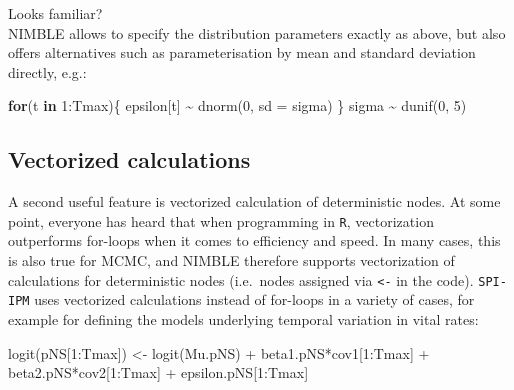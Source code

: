 \documentclass[
]{book}
\newenvironment{Shaded}{\begin{snugshade}}{\end{snugshade}}
\newcommand{\AttributeTok}[1]{\textcolor[rgb]{0.77,0.63,0.00}{#1}}
\newcommand{\ControlFlowTok}[1]{\textcolor[rgb]{0.13,0.29,0.53}{\textbf{#1}}}
\newcommand{\DecValTok}[1]{\textcolor[rgb]{0.00,0.00,0.81}{#1}}
\newcommand{\FunctionTok}[1]{\textcolor[rgb]{0.00,0.00,0.00}{#1}}
\newcommand{\NormalTok}[1]{#1}
\newcommand{\OtherTok}[1]{\textcolor[rgb]{0.56,0.35,0.01}{#1}}
\newcommand{\SpecialCharTok}[1]{\textcolor[rgb]{0.00,0.00,0.00}{#1}}
\begin{document}
Looks familiar?\\
NIMBLE allows to specify the distribution parameters exactly as above, but also
offers alternatives such as parameterisation by mean and standard deviation
directly, e.g.:

\begin{Shaded}
\begin{Highlighting}[]
\ControlFlowTok{for}\NormalTok{(t }\ControlFlowTok{in} \DecValTok{1}\SpecialCharTok{:}\NormalTok{Tmax)\{}
\NormalTok{  epsilon[t] }\SpecialCharTok{\textasciitilde{}} \FunctionTok{dnorm}\NormalTok{(}\DecValTok{0}\NormalTok{, }\AttributeTok{sd =}\NormalTok{ sigma)}
\NormalTok{\}}
\NormalTok{sigma }\SpecialCharTok{\textasciitilde{}} \FunctionTok{dunif}\NormalTok{(}\DecValTok{0}\NormalTok{, }\DecValTok{5}\NormalTok{)}
\end{Highlighting}
\end{Shaded}

\hypertarget{vectorized-calculations}{%
\subsection{Vectorized calculations}\label{vectorized-calculations}}

A second useful feature is vectorized calculation of deterministic nodes. At
some point, everyone has heard that when programming in \texttt{R}, vectorization
outperforms for-loops when it comes to efficiency and speed. In many cases, this
is also true for MCMC, and NIMBLE therefore supports vectorization of
calculations for deterministic nodes (i.e.~nodes assigned via \texttt{\textless{}-} in the code).
\texttt{SPI-IPM} uses vectorized calculations instead of for-loops in a variety of
cases, for example for defining the models underlying temporal variation in
vital rates:

\begin{Shaded}
\begin{Highlighting}[]
\FunctionTok{logit}\NormalTok{(pNS[}\DecValTok{1}\SpecialCharTok{:}\NormalTok{Tmax]) }\OtherTok{\textless{}{-}} \FunctionTok{logit}\NormalTok{(Mu.pNS) }\SpecialCharTok{+}\NormalTok{ beta1.pNS}\SpecialCharTok{*}\NormalTok{cov1[}\DecValTok{1}\SpecialCharTok{:}\NormalTok{Tmax] }\SpecialCharTok{+}\NormalTok{ beta2.pNS}\SpecialCharTok{*}\NormalTok{cov2[}\DecValTok{1}\SpecialCharTok{:}\NormalTok{Tmax] }\SpecialCharTok{+}\NormalTok{ epsilon.pNS[}\DecValTok{1}\SpecialCharTok{:}\NormalTok{Tmax]}
\end{Highlighting}
\end{Shaded}
\end{document}
